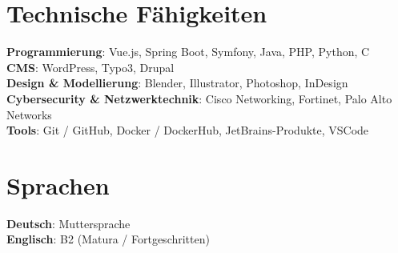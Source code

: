 \documentclass[letterpaper,11pt]{article}
\begin{document}
\section{Technische F\"ahigkeiten}
 \begin{itemize}[leftmargin=0.15in, label={}]
    \small{\item{
     \textbf{Programmierung}{: Vue.js, Spring Boot, Symfony, Java, PHP, Python, C} \\
     \textbf{CMS}{: WordPress, Typo3, Drupal} \\
     \textbf{Design \& Modellierung}{: Blender, Illustrator, Photoshop, InDesign} \\
     \textbf{Cybersecurity \& Netzwerktechnik}{: Cisco Networking, Fortinet, Palo Alto Networks} \\
     \textbf{Tools}{: Git / GitHub, Docker / DockerHub, JetBrains-Produkte, VSCode}
    }}
 \end{itemize}


\section{Sprachen}
 \begin{itemize}[leftmargin=0.15in, label={}]
    \small{\item{
     \textbf{Deutsch}{: Muttersprache} \\
     \textbf{Englisch}{: B2 (Matura / Fortgeschritten)}
    }}
 \end{itemize}


\end{document}
